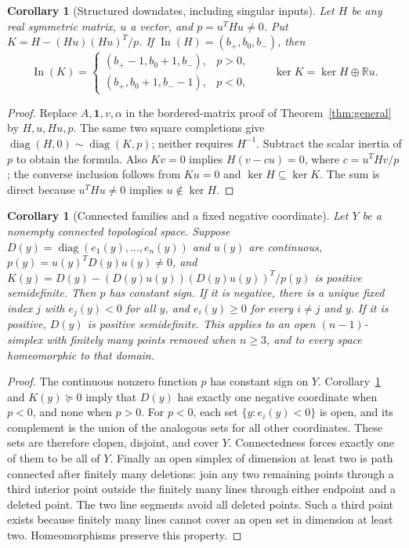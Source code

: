 \documentclass[11pt]{article}
\newtheorem{corollary}[theorem]{Corollary}
\newcommand{\In}{\operatorname{In}}
\newcommand{\diag}{\operatorname{diag}}
\newcommand{\one}{\mathbf{1}}
\newcommand{\R}{\mathbb{R}}
\begin{document}
\begin{corollary}[Structured downdates, including singular inputs]\label{cor:structured}
Let $H$ be any real symmetric matrix, $u$ a vector, and
$p=u^THu\ne0$. Put $K=H-(Hu)(Hu)^T/p$. If
$\In(H)=(b_+,b_0,b_-)$, then
\[
 \In(K)=\begin{cases}
 (b_+-1,b_0+1,b_-),&p>0,\\
 (b_+,b_0+1,b_--1),&p<0,
 \end{cases}
 \qquad \ker K=\ker H\oplus\R u.
\]
\end{corollary}
\begin{proof}
Replace $A,\one,v,\alpha$ in the bordered-matrix proof of
Theorem~\ref{thm:general} by $H,u,Hu,p$. The same two square
completions give $\diag(H,0)\sim\diag(K,p)$; neither requires
$H^{-1}$. Subtract the scalar inertia of $p$ to obtain the formula.
Also $Kv=0$ implies
$H(v-cu)=0$, where $c=u^THv/p$; the converse inclusion follows from
$Ku=0$ and $\ker H\subseteq\ker K$.
The sum is direct because $u^THu\ne0$ implies $u\notin\ker H$.
\end{proof}

\begin{corollary}[Connected families and a fixed negative coordinate]\label{cor:family}
Let $Y$ be a nonempty connected topological space. Suppose
$D(y)=\diag(e_1(y),\ldots,e_n(y))$ and $u(y)$ are continuous,
$p(y)=u(y)^TD(y)u(y)\ne0$, and
$K(y)=D(y)-(D(y)u(y))(D(y)u(y))^T/p(y)$ is positive semidefinite.
Then $p$ has constant sign. If it is negative, there is a unique fixed
index $j$ with $e_j(y)<0$ for all $y$, and $e_i(y)\ge0$ for every
$i\ne j$ and $y$. If it is positive, $D(y)$ is positive semidefinite.
This applies to an open $(n-1)$-simplex with finitely many points removed
when $n\ge3$, and to every space homeomorphic to that domain.
\end{corollary}
\begin{proof}
The continuous nonzero function $p$ has constant sign on $Y$.
Corollary~\ref{cor:structured} and $K(y)\succeq0$ imply that $D(y)$
has exactly one negative coordinate when $p<0$, and none when $p>0$.
For $p<0$, each set $\{y:e_i(y)<0\}$ is open, and its complement is
the union of the analogous sets for all other coordinates. These sets
are therefore clopen, disjoint, and cover $Y$. Connectedness forces
exactly one of them to be all of $Y$.
Finally an open simplex of dimension at least two is path connected
after finitely many deletions: join any two remaining points through
a third interior point outside the finitely many lines through either
endpoint and a deleted point. The two line segments avoid all deleted
points. Such a third point exists because finitely many lines cannot
cover an open set in dimension at least two. Homeomorphisms preserve
this property.
\end{proof}
\end{document}
